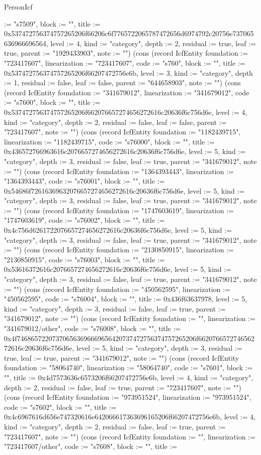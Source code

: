\begin{lexlean}{PersonIcf}
\begin{semanticmodule}
{:= "s7509", block := "", title := 0x537472756374757265206f66206c6f7765722065787472656d6974792c20756e737065636966696564, level := 4, kind := "category", depth := 2, residual := true, leaf := true, parent := "1929433903", note := ""}) (cons (record IcfEntity {foundation := "723417607", linearization := "723417607", code := "s760", block := "", title := 0x537472756374757265206f66207472756e6b, level := 3, kind := "category", depth := 1, residual := false, leaf := false, parent := "644658903", note := ""}) (cons (record IcfEntity {foundation := "341679012", linearization := "341679012", code := "s7600", block := "", title := 0x537472756374757265206f662076657274656272616c20636f6c756d6e, level := 4, kind := "category", depth := 2, residual := false, leaf := false, parent := "723417607", note := ""}) (cons (record IcfEntity {foundation := "1182439715", linearization := "1182439715", code := "s76000", block := "", title := 0x436572766963616c2076657274656272616c20636f6c756d6e, level := 5, kind := "category", depth := 3, residual := false, leaf := true, parent := "341679012", note := ""}) (cons (record IcfEntity {foundation := "1364393443", linearization := "1364393443", code := "s76001", block := "", title := 0x54686f72616369632076657274656272616c20636f6c756d6e, level := 5, kind := "category", depth := 3, residual := false, leaf := true, parent := "341679012", note := ""}) (cons (record IcfEntity {foundation := "1747603619", linearization := "1747603619", code := "s76002", block := "", title := 0x4c756d6261722076657274656272616c20636f6c756d6e, level := 5, kind := "category", depth := 3, residual := false, leaf := true, parent := "341679012", note := ""}) (cons (record IcfEntity {foundation := "2130850915", linearization := "2130850915", code := "s76003", block := "", title := 0x53616372616c2076657274656272616c20636f6c756d6e, level := 5, kind := "category", depth := 3, residual := false, leaf := true, parent := "341679012", note := ""}) (cons (record IcfEntity {foundation := "450562595", linearization := "450562595", code := "s76004", block := "", title := 0x436f63637978, level := 5, kind := "category", depth := 3, residual := false, leaf := true, parent := "341679012", note := ""}) (cons (record IcfEntity {foundation := "", linearization := "341679012/other", code := "s76008", block := "", title := 0x4f746865722073706563696669656420737472756374757265206f662076657274656272616c20636f6c756d6e, level := 5, kind := "category", depth := 3, residual := true, leaf := true, parent := "341679012", note := ""}) (cons (record IcfEntity {foundation := "58064740", linearization := "58064740", code := "s7601", block := "", title := 0x4d7573636c6573206f66207472756e6b, level := 4, kind := "category", depth := 2, residual := false, leaf := true, parent := "723417607", note := ""}) (cons (record IcfEntity {foundation := "973951524", linearization := "973951524", code := "s7602", block := "", title := 0x4c6967616d656e747320616e642066617363696165206f66207472756e6b, level := 4, kind := "category", depth := 2, residual := false, leaf := true, parent := "723417607", note := ""}) (cons (record IcfEntity {foundation := "", linearization := "723417607/other", code := "s7608", block := "", title := }
\end{semanticmodule}
\end{lexlean}
